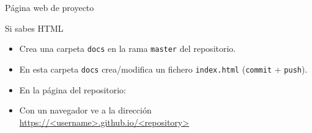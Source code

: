\documentclass[xcolor={usenames,svgnames,dvipsnames}]{beamer}
\begin{document}
\begin{frame}[label={sec:org51e88be},fragile]{Página web de \alert{proyecto}}
 \begin{block}{Si sabes HTML}
\begin{itemize}
\item Crea una carpeta \texttt{docs} en la rama \texttt{master} del repositorio.

\item En esta carpeta \texttt{docs} crea/modifica un fichero \texttt{index.html} (\texttt{commit} + \texttt{push}).

\item En la página del repositorio:
\end{itemize}

\begin{center}
\end{center}

\begin{itemize}
\item Con un navegador ve a la dirección \url{https://<username>.github.io/<repository>}
\end{itemize}
\end{block}
\end{frame}
\end{document}
